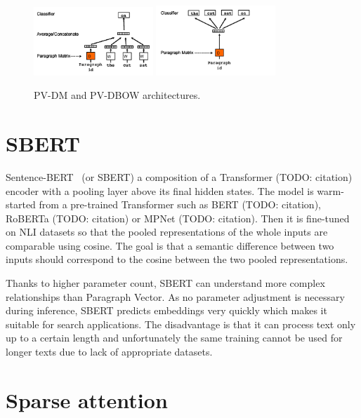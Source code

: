 
\begin{figure}[h]
    \centering
    \includegraphics[width=0.4\textwidth]{./img/pv-dm.png}
    \includegraphics[width=0.4\textwidth]{./img/pv-dbow.png}
    \caption{PV-DM and PV-DBOW architectures.\label{fig:pv-dm_pv-dbow}}
\end{figure}

\section{SBERT}

Sentence-BERT~\cite{reimers2019sentence} (or SBERT) a composition of a
Transformer (TODO: citation) encoder with a pooling layer above its final
hidden states. The model is warm-started from a pre-trained Transformer such as
BERT (TODO: citation), RoBERTa (TODO: citation) or MPNet (TODO: citation). Then
it is fine-tuned on NLI datasets so that the pooled representations of the
whole inputs are comparable using cosine. The goal is that a semantic
difference between two inputs should correspond to the cosine between the
two pooled representations.

Thanks to higher parameter count, SBERT can understand more complex
relationships than Paragraph Vector. As no parameter adjustment is necessary
during inference, SBERT predicts embeddings very quickly which makes it
suitable for search applications. The disadvantage is that it can process text
only up to a certain length and unfortunately the same training cannot be used
for longer texts due to lack of appropriate datasets.

\section{Sparse attention}

